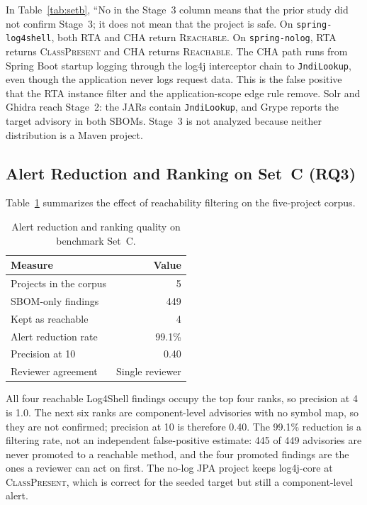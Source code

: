 \documentclass[conference]{IEEEtran}
\begin{document}
In Table~\ref{tab:setb}, ``No in the Stage~3 column means that the prior study did not confirm Stage~3; it does not mean that the project is safe. On \texttt{spring-log4shell}, both RTA and CHA return \textsc{Reachable}. On \texttt{spring-nolog}, RTA returns \textsc{ClassPresent} and CHA returns \textsc{Reachable}. The CHA path runs from Spring Boot startup logging through the log4j interceptor chain to \texttt{JndiLookup}, even though the application never logs request data. This is the false positive that the RTA instance filter and the application-scope edge rule remove. Solr and Ghidra reach Stage~2: the JARs contain \texttt{JndiLookup}, and Grype reports the target advisory in both SBOMs. Stage~3 is not analyzed because neither distribution is a Maven project.

\subsection{Alert Reduction and Ranking on Set~C (RQ3)}
Table~\ref{tab:setc} summarizes the effect of reachability filtering on the five-project corpus.

\begin{table}[t]
\caption{Alert reduction and ranking quality on benchmark Set~C.}
\label{tab:setc}
\centering
\footnotesize
\renewcommand{\arraystretch}{1.1}
\begin{tabular}{@{}p{2.35in}r@{}}
\toprule
Measure & Value \\
\midrule
Projects in the corpus & 5 \\
SBOM-only findings & 449 \\
Kept as reachable & 4 \\
Alert reduction rate & 99.1\% \\
Precision at 10 & 0.40 \\
Reviewer agreement & Single reviewer \\
\bottomrule
\end{tabular}
\end{table}

All four reachable Log4Shell findings occupy the top four ranks, so precision at 4 is 1.0. The next six ranks are component-level advisories with no symbol map, so they are not confirmed; precision at 10 is therefore 0.40. The 99.1\% reduction is a filtering rate, not an independent false-positive estimate: 445 of 449 advisories are never promoted to a reachable method, and the four promoted findings are the ones a reviewer can act on first. The no-log JPA project keeps log4j-core at \textsc{ClassPresent}, which is correct for the seeded target but still a component-level alert.
\end{document}
